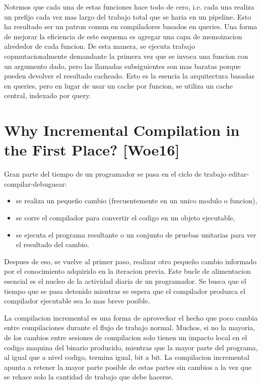 \documentclass[12pt, a4paper]{report}
\begin{document}
      Notemos que cada una de estas funciones hace todo de cero, i.e. cada una realiza un prefijo cada vez mas largo del trabajo total que se haria en un pipeline.
      Esto ha resultado ser un patron comun en compiladores basados en queries.
      Una forma de mejorar la eficiencia de este esquema es agregar una capa de memoizacion alrededor de cada funcion.
      De esta manera, se ejecuta trabajo copmutacionalmente demandante la primera vez que se invoca una funcion con un argumento dado, pero las llamadas subsiguientes son mas baratas porque pueden devolver el resultado cacheado.
      Esto es la esencia la arquitectura basadas en queries, pero en lugar de usar un cache por funcion, se utiliza un cache central, indexado por query.
      \cite{olle_query_based}

  \section*{Why Incremental Compilation in the First Place? [Woe16]}

    Gran parte del tiempo de un programador se pasa en el ciclo de trabajo editar-compilar-debuguear:

    \begin{itemize}
    \item se realiza un pequeño cambio (frecuentemente en un unico modulo o funcion),
    \item se corre el compilador para convertir el codigo en un objeto ejecutable,
    \item se ejecuta el programa resultante o un conjunto de pruebas unitarias para ver el resultado del cambio.
    \end{itemize}

    Despues de eso, se vuelve al primer paso, realizar otro pequeño cambio informado por el conocimiento adquirido en la iteracion previa.
    Este bucle de alimentacion esencial es el nucleo de la actividad diaria de un programador.
    Se busca que el tiempo que se pasa detenido mientras se espera que el compilador produzca el compilador ejecutable sea lo mas breve posible.

    La compilacion incremental es una forma de aprovechar el hecho que poco cambia entre compilaciones durante el flujo de trabajo normal.
    Muchos, si no la mayoria, de los cambios entre sesiones de compilacion solo tienen un impacto local en el codigo maquina del binario producido, mientras que la mayor parte del programa, al igual que a nivel codigo, termina igual, bit a bit.
    La compilacion incremental apunta a retener la mayor parte posible de estas partes sin cambios a la vez que se rehace solo la cantidad de trabajo que debe hacerse.
    \cite{rust_blog_incremental_compilation}
\end{document}
